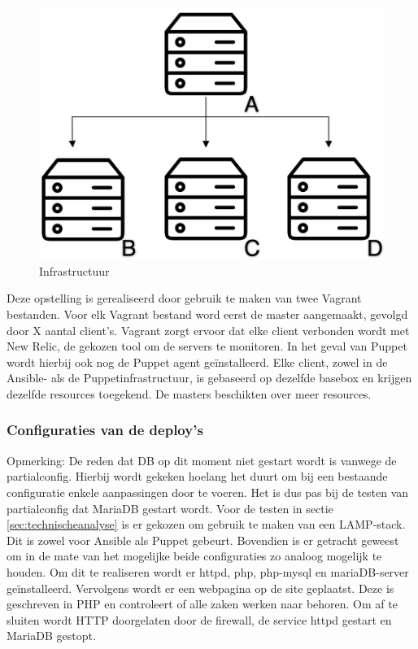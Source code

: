 \begin{figure}
	\includegraphics[width=0.9\linewidth]{img/infrastructruur.png} 
	\caption{Infrastructuur}
	\label{fig:infrastructuur}
\end{figure}



Deze opstelling is gerealiseerd door gebruik te maken van twee Vagrant bestanden. Voor elk Vagrant bestand word eerst de master aangemaakt, gevolgd door X aantal client's. Vagrant zorgt ervoor dat elke client  verbonden wordt met New Relic, de gekozen tool om de servers te monitoren. In het geval van Puppet wordt hierbij ook nog de Puppet agent ge\"installeerd. Elke client, zowel in de Ansible- als de Puppetinfrastructuur, is gebaseerd op dezelfde basebox en krijgen dezelfde resources toegekend. De masters beschikten over meer resources.


\subsubsection{Configuraties van de deploy's}

Opmerking: De reden dat DB op dit moment niet gestart wordt is vanwege de \gls{partialconfig}. Hierbij wordt gekeken hoelang het duurt om bij een bestaande configuratie enkele aanpassingen door te voeren. Het is dus pas bij de testen van \gls{partialconfig} dat MariaDB gestart wordt.
Voor de testen in sectie \ref{sec:technischeanalyse} is er gekozen om gebruik te maken van een LAMP-stack. Dit is zowel voor Ansible als Puppet gebeurt. Bovendien is er getracht geweest om in de mate van het mogelijke beide configuraties zo analoog mogelijk te houden. Om dit te realiseren wordt er httpd, php, php-mysql en mariaDB-server ge\"installeerd. Vervolgens wordt er een webpagina op de site geplaatst. Deze is geschreven in PHP en controleert of alle zaken werken naar behoren. Om af te sluiten wordt HTTP doorgelaten door de firewall, de service httpd gestart en MariaDB gestopt. 

